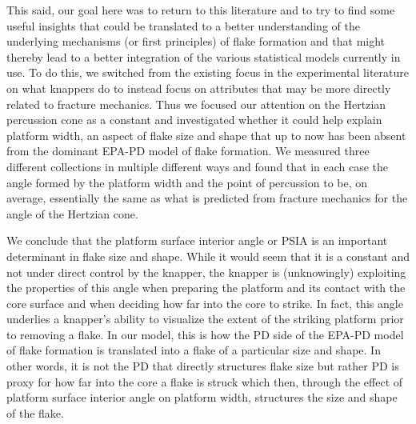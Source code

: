 \documentclass[10pt,letterpaper]{article}
\begin{document}
This said, our goal here was to return to this literature and to try to
find some useful insights that could be translated to a better
understanding of the underlying mechanisms (or first principles) of
flake formation and that might thereby lead to a better integration of
the various statistical models currently in use. To do this, we switched
from the existing focus in the experimental literature on what knappers
do to instead focus on attributes that may be more directly related to
fracture mechanics. Thus we focused our attention on the Hertzian
percussion cone as a constant and investigated whether it could help
explain platform width, an aspect of flake size and shape that up to now
has been absent from the dominant EPA-PD model of flake formation. We
measured three different collections in multiple different ways and
found that in each case the angle formed by the platform width and the
point of percussion to be, on average, essentially the same as what is
predicted from fracture mechanics for the angle of the Hertzian cone.

We conclude that the platform surface interior angle or PSIA is an
important determinant in flake size and shape. While it would seem that
it is a constant and not under direct control by the knapper, the
knapper is (unknowingly) exploiting the properties of this angle when
preparing the platform and its contact with the core surface and when
deciding how far into the core to strike. In fact, this angle underlies
a knapper's ability to visualize the extent of the striking platform
prior to removing a flake. In our model, this is how the PD side of the
EPA-PD model of flake formation is translated into a flake of a
particular size and shape. In other words, it is not the PD that
directly structures flake size but rather PD is proxy for how far into
the core a flake is struck which then, through the effect of platform
surface interior angle on platform width, structures the size and shape
of the flake.
\end{document}
